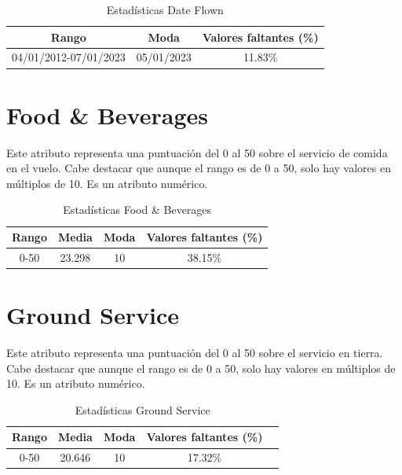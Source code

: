 \documentclass[12pt]{report} %
\begin{document}
    \begin{table}[H]
        \begin{center}
            \begin{tabular}{ @{}ccc@{} }
                \toprule
                Rango & Moda & Valores faltantes (\%) \\
                \midrule
                04/01/2012-07/01/2023 & 05/01/2023 & 11.83\% \\
                \bottomrule
            \end{tabular}
            \caption{Estadísticas Date Flown}
        \end{center}
    \end{table}

    \section{Food \& Beverages}

    Este atributo representa una puntuación del 0 al 50 sobre el servicio de comida
    en el vuelo. Cabe destacar que aunque el rango es de 0 a 50, solo hay valores en múltiplos de 10.
    Es un atributo numérico.

    \begin{table}[H]
        \begin{center}
            \begin{tabular}{ @{}cccc@{} }
                \toprule
                Rango & Media & Moda & Valores faltantes (\%) \\
                \midrule
                0-50 & 23.298 & 10 & 38.15\% \\
                \bottomrule
            \end{tabular}
            \caption{Estadísticas Food \& Beverages}
        \end{center}
    \end{table}

    \section{Ground Service}

    Este atributo representa una puntuación del 0 al 50 sobre el servicio
    en tierra. Cabe destacar que aunque el rango es de 0 a 50, solo hay valores en múltiplos de 10.
    Es un atributo numérico.

    \begin{table}[H]
        \begin{center}
            \begin{tabular}{ @{}ccccc@{} }
                \toprule
                Rango & Media & Moda & Valores faltantes (\%) \\
                \midrule
                0-50 & 20.646 & 10 & 17.32\% \\
                \bottomrule
            \end{tabular}
            \caption{Estadísticas Ground Service}
        \end{center}
    \end{table}
\end{document}
